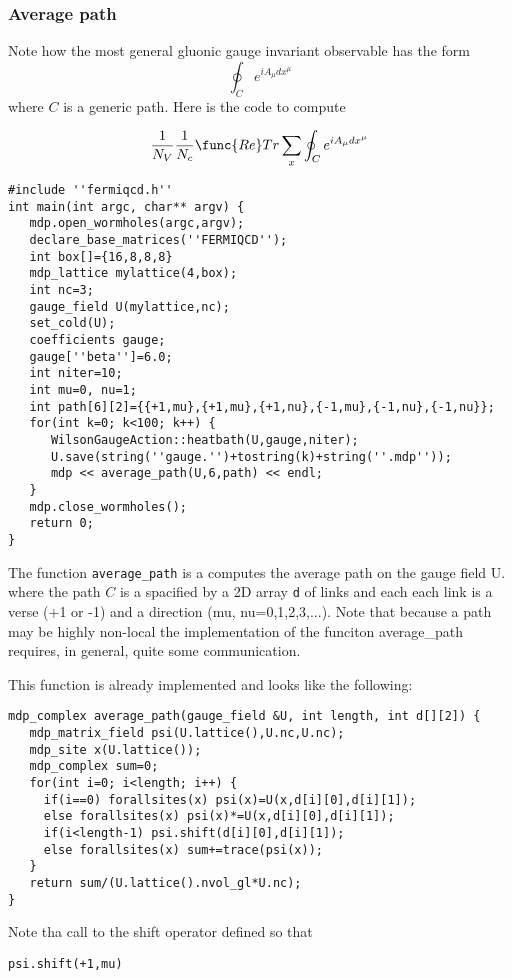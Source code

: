 \subsubsection{Average path}

Note how the most general gluonic gauge invariant observable has the form 
\[
\oint_Ce^{iA_\mu dx^\mu } 
\]
where $C$ is a generic path. Here is the code to compute

\[
\frac 1{N_V}\frac 1{N_c}\func{Re}Tr\sum_x\oint_Ce^{iA_\mu dx^\mu } 
\]
\begin{verbatim}
#include ''fermiqcd.h''
int main(int argc, char** argv) {
   mdp.open_wormholes(argc,argv);
   declare_base_matrices(''FERMIQCD'');
   int box[]={16,8,8,8}
   mdp_lattice mylattice(4,box);
   int nc=3;
   gauge_field U(mylattice,nc);
   set_cold(U);
   coefficients gauge;
   gauge[''beta'']=6.0;
   int niter=10;
   int mu=0, nu=1;
   int path[6][2]={{+1,mu},{+1,mu},{+1,nu},{-1,mu},{-1,nu},{-1,nu}};
   for(int k=0; k<100; k++) {
      WilsonGaugeAction::heatbath(U,gauge,niter);
      U.save(string(''gauge.'')+tostring(k)+string(''.mdp''));
      mdp << average_path(U,6,path) << endl;
   }
   mdp.close_wormholes();
   return 0;
}
\end{verbatim}

The function {\tt average\_path} is a computes the average path on the gauge
field U. where the path $C$ is a spacified by a 2D array {\tt d} of links
and each each link is a verse (+1 or -1) and a direction (mu,
nu=0,1,2,3,...). Note that because a path may be highly non-local the
implementation of the funciton average\_path requires, in general, quite
some communication.

This function is already implemented and looks like the following:
\begin{verbatim}
mdp_complex average_path(gauge_field &U, int length, int d[][2]) {
   mdp_matrix_field psi(U.lattice(),U.nc,U.nc);
   mdp_site x(U.lattice());
   mdp_complex sum=0;
   for(int i=0; i<length; i++) {
     if(i==0) forallsites(x) psi(x)=U(x,d[i][0],d[i][1]);
     else forallsites(x) psi(x)*=U(x,d[i][0],d[i][1]);
     if(i<length-1) psi.shift(d[i][0],d[i][1]);
     else forallsites(x) sum+=trace(psi(x));
   }
   return sum/(U.lattice().nvol_gl*U.nc);
}
\end{verbatim}

Note tha call to the shift operator defined so that
\begin{verbatim}
psi.shift(+1,mu)
\end{verbatim}


